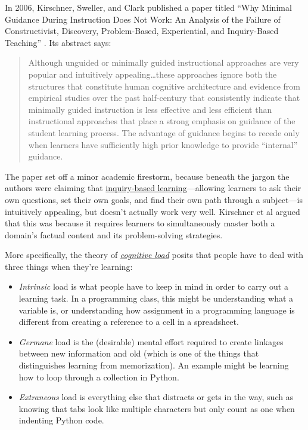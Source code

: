 
In 2006, Kirschner, Sweller, and Clark published a paper titled ``Why
Minimal Guidance During Instruction Does Not Work: An Analysis of the
Failure of Constructivist, Discovery, Problem-Based, Experiential, and
Inquiry-Based Teaching'' \cite{bib:kirschner-minimal}. Its abstract
says:

\begin{quote}

  Although unguided or minimally guided instructional approaches are
  very popular and intuitively appealing\ldots{}these approaches
  ignore both the structures that constitute human cognitive
  architecture and evidence from empirical studies over the past
  half-century that consistently indicate that minimally guided
  instruction is less effective and less efficient than instructional
  approaches that place a strong emphasis on guidance of the student
  learning process. The advantage of guidance begins to recede only
  when learners have sufficiently high prior knowledge to provide
  ``internal'' guidance.

\end{quote}

The paper set off a minor academic firestorm, because beneath the jargon
the authors were claiming that
\href{https://en.wikipedia.org/wiki/Inquiry-based\_learning}{inquiry-based
learning}---allowing learners to ask their own questions, set their
own goals, and find their own path through a subject---is intuitively
appealing, but doesn't actually work very well. Kirschner et al argued
that this was because it requires learners to simultaneously master
both a domain's factual content and its problem-solving strategies.

More specifically, the theory of
\emph{\href{https://en.wikipedia.org/wiki/Cognitive\_load}{cognitive load}}
posits that people have to deal with three things when they're
learning:

\begin{itemize}

\item
  \emph{Intrinsic} load is what people have to keep in mind in order to
  carry out a learning task.  In a programming class, this might be
  understanding what a variable is, or understanding how assignment in
  a programming language is different from creating a reference to a
  cell in a spreadsheet.

\item
  \emph{Germane} load is the (desirable) mental effort required to
  create linkages between new information and old (which is one of the
  things that distinguishes learning from memorization).  An example
  might be learning how to loop through a collection in Python.

\item
  \emph{Extraneous} load is everything else that distracts or gets in
  the way, such as knowing that tabs look like multiple characters but
  only count as one when indenting Python code.

\end{itemize}

